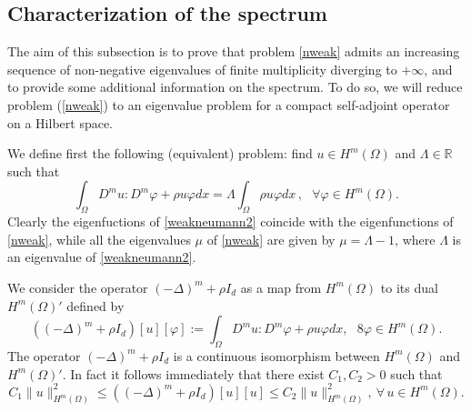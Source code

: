 \documentclass[11pt,a4paper]{amsart}
\numberwithin{equation}{section}
\begin{document}
\subsection{Characterization of the spectrum}

The aim of this subsection is to prove that problem \eqref{nweak} admits an increasing sequence of non-negative eigenvalues of finite multiplicity diverging to $+\infty$, and to provide some additional information on the spectrum. To do so, we will reduce problem (\ref{nweak}) to an eigenvalue problem for a compact self-adjoint operator on a Hilbert space. 

We define first the following (equivalent) problem: find $u\in H^m(\Omega)$ and $\Lambda\in\mathbb R$ such that
\begin{equation}\label{weakneumann2}
\int_{\Omega}D^mu:D^m\varphi +\rho u\varphi dx=\Lambda\int_{\Omega}\rho u\varphi dx\,,\ \ \ \forall \varphi\in H^m(\Omega).
\end{equation}
Clearly the eigenfuctions of \eqref{weakneumann2} coincide with the eigenfunctions of \eqref{nweak}, while all the eigenvalues $\mu$ of \eqref{nweak} are given by $\mu=\Lambda-1$, where $\Lambda$ is an eigenvalue of \eqref{weakneumann2}.


We consider the operator $(-\Delta)^m+\rho I_d$ as a map from $H^m(\Omega)$ to its dual $H^m(\Omega)'$ defined by
\begin{equation*}
((-\Delta)^m+\rho I_d)[u][\varphi]:=\int_\Omega D^m u: D^m\varphi +\rho u\varphi dx,\ \ \ \mathcal8\varphi\in H^m(\Omega).
\end{equation*}
The operator $(-\Delta)^m+\rho I_d$ is a continuous isomorphism between $H^m(\Omega)$ and $H^m(\Omega)'$. In fact it follows immediately that there exist $C_1,C_2>0$ such that
\begin{equation}\label{scalarp}
C_1\|u\|^2_{H^m(\Omega)}\leq((-\Delta)^m+\rho I_d)[u][u]\leq C_2 \|u\|^2_{H^m(\Omega)},\ \forall\,u\in H^m(\Omega).
\end{equation}
\end{document}
